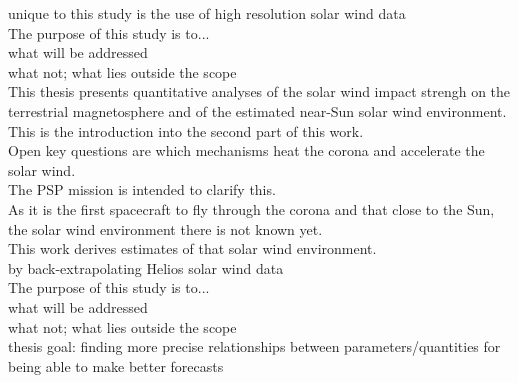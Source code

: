 unique to this study is the use of high resolution solar wind data\\


The purpose of this study is to...\\

what will be addressed\\
what not; what lies outside the scope\\


This thesis presents quantitative analyses of the solar wind impact strengh on the terrestrial magnetosphere and of the estimated near-Sun solar wind environment.\\





This is the introduction into the second part of this work.\\



Open key questions are which mechanisms heat the corona and accelerate the solar wind.\\
The PSP mission is intended to clarify this.\\
As it is the first spacecraft to fly through the corona and that close to the Sun, the solar wind environment there is not known yet.\\


This work derives estimates of that solar wind environment.\\

by back-extrapolating Helios solar wind data\\



The purpose of this study is to...\\

what will be addressed\\
what not; what lies outside the scope\\



thesis goal: finding more precise relationships between parameters/quantities for being able to make better forecasts\\



